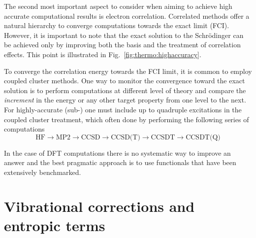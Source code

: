 \documentclass[../Main/chem371-notes.tex]{subfiles}
\begin{document}

The second most important aspect to consider when aiming to achieve high accurate computational results is electron correlation.
Correlated methods offer a natural hierarchy to converge computations towards the exact limit (FCI).
However, it is important to note that the exact solution to the Schr\"{o}dinger can be achieved only by improving both the basis and the treatment of correlation effects.
This point is illustrated in Fig.~\ref{fig:thermo:highaccuracy}.

To converge the correlation energy towards the FCI limit, it is common to employ coupled cluster methods.
One way to monitor the convergence toward the exact solution is to perform computations at different level of theory and compare the \emph{increment} in the energy or any other target property from one level to the next.
For highly-accurate (sub-\kcal) one must include up to quadruple excitations in the coupled cluster treatment, which often done by performing the following series of computations
\begin{equation}
\text{HF} \rightarrow \text{MP2} \rightarrow \text{CCSD} \rightarrow \text{CCSD(T)} \rightarrow \text{CCSDT} \rightarrow \text{CCSDT(Q)}
\end{equation}

In the case of DFT computations there is no systematic way to improve an answer and the best pragmatic approach is to use functionals that have been extensively benchmarked.

\section{Vibrational corrections and entropic terms}
\end{document}
